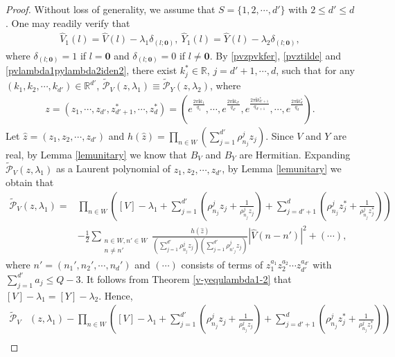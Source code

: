 \documentclass[12pt,letterpaper]{amsart}
\def\R{{\mathbb R}}
\begin{document}
\begin{proof}Without loss of generality, we assume that $S=\{1,2,\cdots,d'\}$ with $2\leq d'\leq d$.
One may readily verify that
\begin{align}
\hat{V}_1(l)=
\hat{V}{(l)}-\lambda_1\delta_{(l;\mathbf{0})},\   \hat{Y}_1(l)=
\hat{Y}{(l)}-\lambda_2\delta_{(l;\mathbf{0})},\label{v1vy1y}
\end{align}
where $\delta_{(l;\mathbf{0})}=1$ if $l=\mathbf{0}$ and $\delta_{(l;\mathbf{0})}=0$ if $l\neq\mathbf{0}$.
By \eqref{pvzpvkfer}, \eqref{pvztilde} and \eqref{pvlambda1pylambda2iden2}, there exist $k_j^*\in\R$, $j=d'+1,\cdots,d$, such that for any $(k_1,k_2,\cdots,k_{d'})\in\R^{d'}$,
$\tilde{\mathcal{P}}_V(z,\lambda_1)\equiv\tilde{\mathcal{P}}_Y(z,\lambda_2)$, where
\begin{align}
z=(z_1,\cdots,z_{d'},z_{d'+1}^*,\cdots,z_d^*)=\left(e^{\frac{2\pi\mathbf{i} k_1}{q_1}},\cdots,e^{\frac{2\pi\mathbf{i} k_{d'}}{q_{d'}}},e^{\frac{2\pi\mathbf{i} k_{d'+1}^*}{q_{d'+1}}},\cdots,e^{\frac{2\pi\mathbf{i} k_d^*}{q_d}}\right).\nonumber
\end{align}
Let $\hat{z}=(z_1,z_2,\cdots,z_{d'})$ and $h(\hat{z})=\prod_{n\in W}\left(\sum_{j=1}^{d'}\rho^j_{n_j}z_j\right)$. Since $V$ and $Y$ are real, by Lemma \ref{lemunitary} we know that $B_V$ and $B_Y$ are Hermitian.
Expanding $\tilde{\mathcal{P}}_V(z,\lambda_1)$ as a Laurent polynomial of $z_1,z_2,\cdots,z_{d'}$, by Lemma \ref{lemunitary} we obtain that
\begin{align}
\tilde{\mathcal{P}}_V(z,\lambda_1)
=&\prod_{n\in W}\left([V]-\lambda_1+\sum_{j=1}^{d'}\left(\rho^j_{n_j}z_j+\frac{1}{\rho^j_{n_j}z_j}\right)+\sum_{j=d'+1}^{d}\left(\rho^j_{n_j}z_j^*+\frac{1}{\rho^j_{n_j}z_j^*}\right)\right)\nonumber\\
&-\frac{1}{2}\sum_{\substack{n\in W,n'\in W\\n\neq n'}}\frac{h(\hat{z})}{\left(\sum_{j=1}^{d'}\rho^j_{n_j}z_j\right)\left(\sum_{j=1}^{d'}\rho^j_{n'_j}z_j\right)}\left|{\hat{V}(n-n')}\right|^2+(\cdots),\nonumber
\end{align}
where $n'=(n_1',n_2',\cdots,n_d')$ and $(\cdots)$ consists of terms of $z_1^{a_1}z_2^{a_2}\cdots z_{d'}^{a_{d'}}$ with $\sum_{j=1}^{d'}a_j\leq Q-3$. It follows from Theorem \ref{v-yequlambda1-2} that $[V]-\lambda_1=[Y]-\lambda_2$.
Hence,
\begin{align}
\tilde{\mathcal{P}}_V&(z,\lambda_1)-\prod_{n\in W}\left([V]-\lambda_1+\sum_{j=1}^{d'}\left(\rho^j_{n_j}z_j+\frac{1}{\rho^j_{n_j}z_j}\right)+\sum_{j=d'+1}^{d}\left(\rho^j_{n_j}z_j^*+\frac{1}{\rho^j_{n_j}z_j^*}\right)\right)\nonumber\\

\end{align}
\end{proof}
\end{document}
